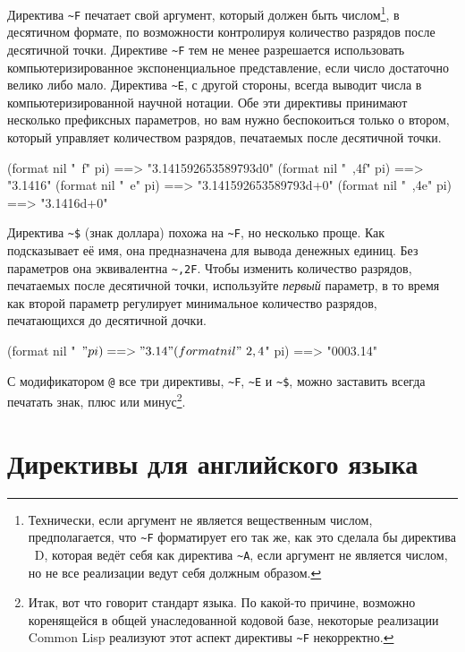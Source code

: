 Директива \lstinline!~F! печатает свой аргумент, который должен быть
числом\footnote{Технически, если аргумент не является вещественным числом, предполагается,
  что \lstinline!~F! форматирует его так же, как это сделала бы директива ~D, которая
  ведёт себя как директива \lstinline!~A!, если аргумент не является числом, но не все
  реализации ведут себя должным образом.}\hspace{\footnotenegspace}, в десятичном формате, по возможности
контролируя количество разрядов после десятичной точки. Директиве \lstinline!~F! тем не
менее разрешается использовать компьютеризированное экспоненциальное представление, если
число достаточно велико либо мало. Директива \lstinline!~E!, с другой стороны, всегда
выводит числа в компьютеризированной научной нотации. Обе эти директивы принимают
несколько префиксных параметров, но вам нужно беспокоиться только о втором, который
управляет количеством разрядов, печатаемых после десятичной точки.

\begin{myverb}
(format nil "~f" pi)   ==> "3.141592653589793d0"
(format nil "~,4f" pi) ==> "3.1416"
(format nil "~e" pi)   ==> "3.141592653589793d+0"
(format nil "~,4e" pi) ==> "3.1416d+0"
\end{myverb}

Директива \lstinline!~$! (знак доллара) похожа на \lstinline!~F!, но несколько
проще. Как подсказывает её имя, она предназначена для вывода денежных единиц. Без
параметров она эквивалентна \lstinline!~,2F!. Чтобы изменить количество разрядов,
печатаемых после десятичной точки, используйте \textit{первый} параметр, в то время как
второй параметр регулирует минимальное количество разрядов, печатающихся до десятичной
дочки.%

\begin{myverb}
(format nil "~$" pi) ==> "3.14"
(format nil "~2,4$" pi) ==> "0003.14"
\end{myverb}

С модификатором \lstinline!@! все три директивы, \lstinline!~F!, \lstinline!~E! и
\lstinline!~$!, можно заставить всегда печатать знак, плюс или минус\footnote{Итак, вот
  что говорит стандарт языка. По какой-то причине, возможно коренящейся в общей
  унаследованной кодовой базе, некоторые реализации Common Lisp реализуют этот аспект
  директивы \lstinline!~F! некорректно.}\hspace{\footnotenegspace}. %

\section{Директивы для английского языка}
\label{ch18:eng-lang}

